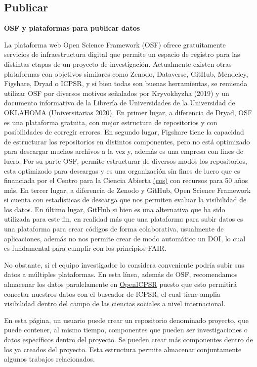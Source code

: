 \documentclass[
  spanish,
  letterpaper,
  DIV=11,
  numbers=noendperiod]{scrreprt}
\begin{document}
\subsection{\texorpdfstring{\textbf{Publicar}}{Publicar}}\label{publicar}

\textbf{OSF y plataformas para publicar datos}

La plataforma web Open Science Framework (OSF) ofrece gratuitamente
servicios de infraestructura digital que permite un espacio de registro
para las distintas etapas de un proyecto de investigación. Actualmente
existen otras plataformas con objetivos similares como Zenodo,
Dataverse, GitHub, Mendeley, Figshare, Dryad o ICPSR, y si bien todas
son buenas herramientas, se remienda utilizar OSF por diversos motivos
señalados por Kryvokhyzha (2019) y un documento informativo de la
Librería de Universidades de la Universidad de OKLAHOMA (Universitarias
2020). En primer lugar, a diferencia de Dryad, OSF es una plataforma
gratuita, con mejor estructura de repositorios y con posibilidades de
corregir errores. En segundo lugar, Figshare tiene la capacidad de
estructurar los repositorios en distintos componentes, pero no está
optimizado para descargar muchos archivos a la vez y, además es una
empresa con fines de lucro. Por su parte OSF, permite estructurar de
diversos modos los repositorios, esta optimizado para descargas y es una
organización sin fines de lucro que es financiada por el Centro para la
Ciencia Abierta \href{https://www.cos.io/}{(cos)} con recursos para 50
años más. En tercer lugar, a diferencia de Zenodo y GitHub, Open Science
Framework si cuenta con estadísticas de descarga que nos permiten
evaluar la visibilidad de los datos. En último lugar, GitHub si bien es
una alternativa que ha sido utilizada para este fin, en realidad más que
una plataforma para subir datos es una plataforma para crear códigos de
forma colaborativa, usualmente de aplicaciones, además no nos permite
crear de modo automático un DOI, lo cual es fundamental para cumplir con
los principios FAIR.

No obstante, si el equipo investigador lo considera conveniente podría
subir sus datos a múltiples plataformas. En esta línea, además de OSF,
recomendamos almacenar los datos paralelamente en
\href{https://www.openicpsr.org/openicpsr/workspace?path=openICPSR}{OpenICPSR}
puesto que esto permitirá conectar nuestros datos con el buscador de
ICPSR, el cual tiene amplia visibilidad dentro del campo de las ciencias
sociales a nivel internacional.

En esta página, un usuario puede crear un repositorio denominado
proyecto, que puede contener, al mismo tiempo, componentes que pueden
ser investigaciones o datos específicos dentro del proyecto. Se pueden
crear más componentes dentro de los ya creados del proyecto. Esta
estructura permite almacenar conjuntamente algunos trabajos
relacionados.
\end{document}
